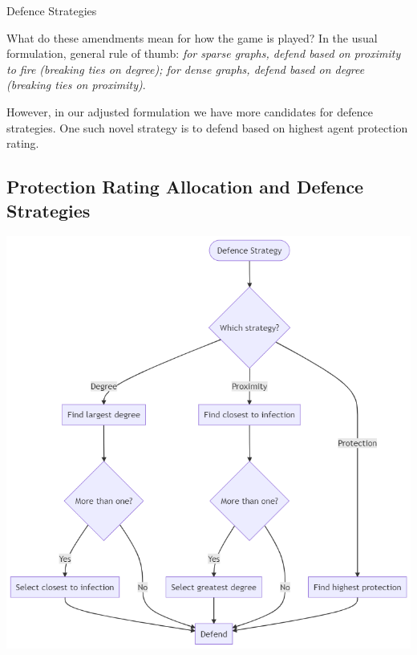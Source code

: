 \documentclass[unknownkeysallowed]{beamer}
\begin{document}
\begin{frame}{Defence Strategies}

What do these amendments mean for how the game is played? In the usual formulation, general rule of thumb: {\it for sparse graphs, defend based on proximity to fire (breaking ties on degree); for dense graphs, defend based on degree (breaking ties on proximity)}. \pause

\vspace{5pt}

However, in our adjusted formulation we have more candidates for defence strategies. One such novel strategy is to defend based on highest agent protection rating.

\end{frame}

\subsection{Protection Rating Allocation and Defence Strategies}

\begin{frame}
\centering\includegraphics[height=.9\textheight]{assets/flowcharts/defence}
\end{frame}
\end{document}
